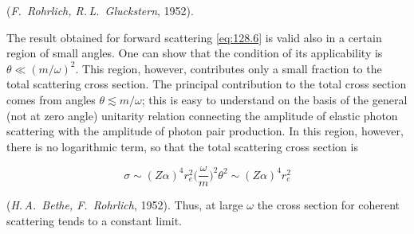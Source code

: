 (\emph{F.~Rohrlich, R.\,L.~Gluckstern}, 1952).

The result obtained for forward scattering \eqref{eq:128.6} is valid also in a certain region of small angles. One can show that the condition of its applicability is $\theta \ll (m/\omega)^2$. This region, however, contributes only a small fraction to the total scattering cross section. The principal contribution to the total cross section comes from angles $\theta \lesssim m/\omega$; this is easy to understand on the basis of the general (not at zero angle) unitarity relation connecting the amplitude of elastic photon scattering with the amplitude of photon pair production. In this region, however, there is no logarithmic term, so that the total scattering cross section is

\begin{equation}
\sigma \sim (Z\alpha)^4 r_e^2 \biggl(\frac{\omega}{m}\biggr)^{\!2} \theta^2 \sim (Z\alpha)^4 r_e^2
\label{eq:128.7}
\end{equation}

(\emph{H.\,A.~Bethe, F.~Rohrlich}, 1952). Thus, at large $\omega$ the cross section for coherent scattering tends to a constant limit.
